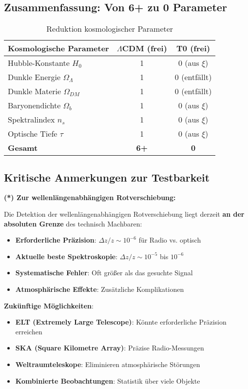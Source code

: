 \documentclass[12pt,a4paper]{article}
\theoremstyle{definition}
\begin{document}
\subsection{Zusammenfassung: Von 6+ zu 0 Parameter}
\label{subsec:cosmic_summary}

\begin{table}[h]
	\centering
	\begin{tabular}{lcc}
		\toprule
		\textbf{Kosmologische Parameter} & \textbf{$\Lambda$CDM (frei)} & \textbf{T0 (frei)} \\
		\midrule
		Hubble-Konstante $H_0$ & 1 & 0 (aus $\xi$) \\
		Dunkle Energie $\Omega_{\Lambda}$ & 1 & 0 (entfällt) \\
		Dunkle Materie $\Omega_{DM}$ & 1 & 0 (entfällt) \\
		Baryonendichte $\Omega_b$ & 1 & 0 (aus $\xi$) \\
		Spektralindex $n_s$ & 1 & 0 (aus $\xi$) \\
		Optische Tiefe $\tau$ & 1 & 0 (aus $\xi$) \\
		\midrule
		\textbf{Gesamt} & \textbf{6+} & \textbf{0} \\
		\bottomrule
	\end{tabular}
	\caption{Reduktion kosmologischer Parameter}
\end{table}

\subsection{Kritische Anmerkungen zur Testbarkeit}
\label{subsec:testability_notes}

\textbf{(*) Zur wellenlängenabhängigen Rotverschiebung:}

Die Detektion der wellenlängenabhängigen Rotverschiebung liegt derzeit \textbf{an der absoluten Grenze} des technisch Machbaren:

\begin{itemize}
	\item \textbf{Erforderliche Präzision}: $\Delta z/z \sim 10^{-6}$ für Radio vs. optisch
	\item \textbf{Aktuelle beste Spektroskopie}: $\Delta z/z \sim 10^{-5}$ bis $10^{-6}$
	\item \textbf{Systematische Fehler}: Oft größer als das gesuchte Signal
	\item \textbf{Atmosphärische Effekte}: Zusätzliche Komplikationen
\end{itemize}

\textbf{Zukünftige Möglichkeiten}:
\begin{itemize}
	\item \textbf{ELT (Extremely Large Telescope)}: Könnte erforderliche Präzision erreichen
	\item \textbf{SKA (Square Kilometre Array)}: Präzise Radio-Messungen
	\item \textbf{Weltraumteleskope}: Eliminieren atmosphärische Störungen
	\item \textbf{Kombinierte Beobachtungen}: Statistik über viele Objekte
\end{itemize}
\end{document}
